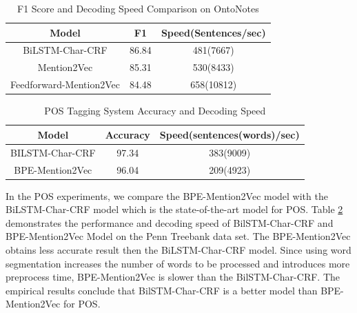 \begin{table}[]
\centering
\caption{F1 Score and Decoding Speed Comparison on OntoNotes}
\label{table:ner-mention2vec2}
\begin{tabular}{|c|c|c|}
\hline
Model            & F1     & Speed(Sentences/sec) \\ \hline
BiLSTM-Char-CRF  & 86.84 & 481(7667)     \\ \hline
Mention2Vec      & 85.31 &   530(8433)          \\ \hline
Feedforward-Mention2Vec  & 84.48  &  658(10812)                   \\ \hline
\end{tabular}
\end{table}

\begin{table}[]
\centering
\caption{POS Tagging System Accuracy and Decoding Speed}
\label{table:pos-mention2vec}
\begin{tabular}{|c|c|c|}
\hline
Model   & Accuracy     & Speed(sentences(words)/sec) \\ \hline
BILSTM-Char-CRF & 97.34  & 383(9009)                  \\ \hline
BPE-Mention2Vec      & 96.04  & 209(4923)                   \\ \hline
\end{tabular}
\end{table}

In the POS experiments, we compare the BPE-Mention2Vec model with the BiLSTM-Char-CRF model which is the state-of-the-art model for POS. Table \ref{table:pos-mention2vec} demonstrates the performance and decoding speed of BilSTM-Char-CRF and BPE-Mention2Vec Model on the Penn Treebank data set. The BPE-Mention2Vec obtains less accurate result then the BiLSTM-Char-CRF model. Since using word segmentation increases the number of words to be processed and introduces more preprocess time, BPE-Mention2Vec is slower than the BilSTM-Char-CRF. The empirical results conclude that BilSTM-Char-CRF is a better model than BPE-Mention2Vec for POS. 
